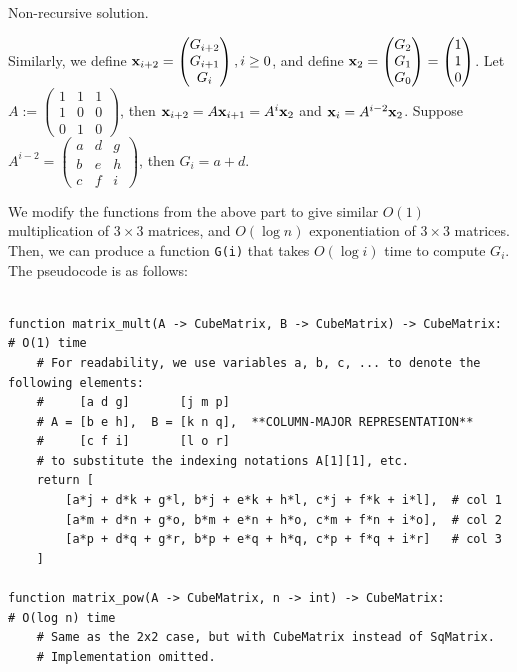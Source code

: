 \documentclass[answers]{exam}
\begin{document}
\begin{questions}
\begin{parts}
\begin{subparts}
            \subpart Non-recursive solution.
            \begin{solution}
                Similarly, we define $\bm{\mathrm{x}}_{i+2}=\begin{pmatrix}G_{i+2}\\G_{i+1}\\G_{i}\end{pmatrix}, i\geq 0$, and define $\bm{\mathrm{x}}_2=\begin{pmatrix}G_2\\G_1\\G_0\end{pmatrix}=\begin{pmatrix}1\\1\\0\end{pmatrix}$.
                Let $A:=\begin{pmatrix}1&1&1\\1&0&0\\0&1&0\end{pmatrix}$, then $\bm{\mathrm{x}}_{i+2}=A\bm{\mathrm{x}}_{i+1}=A^i\bm{\mathrm{x}}_2$ and $\bm{\mathrm{x}}_i=A^{i-2}\bm{\mathrm{x}}_2$.
                Suppose $A^{i-2}=\begin{pmatrix}a&d&g\\b&e&h\\c&f&i\end{pmatrix}$, then $G_{i}=a+d$.

                We modify the functions from the above part to give similar $O(1)$ multiplication of $3\times 3$ matrices, and $O(\log n)$ exponentiation of $3\times 3$ matrices.
                Then, we can produce a function \texttt{G(i)} that takes $O(\log i)$ time to compute $G_i$.
                The pseudocode is as follows:

                \begin{verbatim}

function matrix_mult(A -> CubeMatrix, B -> CubeMatrix) -> CubeMatrix:     # O(1) time
    # For readability, we use variables a, b, c, ... to denote the following elements:
    #     [a d g]       [j m p]
    # A = [b e h],  B = [k n q],  **COLUMN-MAJOR REPRESENTATION**
    #     [c f i]       [l o r]
    # to substitute the indexing notations A[1][1], etc.
    return [
        [a*j + d*k + g*l, b*j + e*k + h*l, c*j + f*k + i*l],  # col 1
        [a*m + d*n + g*o, b*m + e*n + h*o, c*m + f*n + i*o],  # col 2
        [a*p + d*q + g*r, b*p + e*q + h*q, c*p + f*q + i*r]   # col 3
    ]

function matrix_pow(A -> CubeMatrix, n -> int) -> CubeMatrix:         # O(log n) time
    # Same as the 2x2 case, but with CubeMatrix instead of SqMatrix.
    # Implementation omitted.


\end{verbatim}
\end{solution}
\end{subparts}
\end{parts}
\end{questions}
\end{document}
